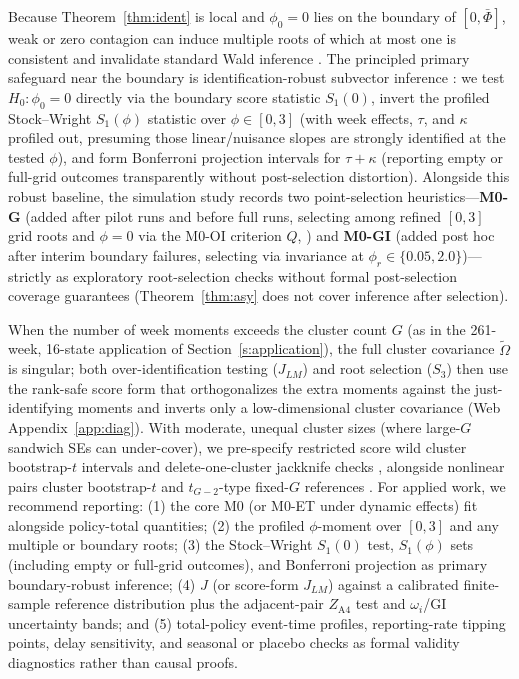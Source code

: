 Because Theorem~\ref{thm:ident} is local and $\phi_0=0$ lies on the boundary of $[0,\bar\Phi]$,
weak or zero contagion can induce multiple roots of which at most one is consistent \citep{small2000multiple}
and invalidate standard Wald inference \citep{andrews1999boundary}. The principled primary safeguard
near the boundary is identification-robust subvector inference \citep{stock2000weak,kleibergen2005testing,andrews2017subvector,cox2026simple}:
we test $H_0:\phi_0=0$ directly via the boundary score statistic $S_1(0)$, invert the profiled
Stock--Wright $S_1(\phi)$ statistic over $\phi\in[0,3]$ (with week effects, $\tau$, and $\kappa$
profiled out, presuming those linear/nuisance slopes are strongly identified at the tested $\phi$),
and form Bonferroni projection intervals for $\tau+\kappa$ (reporting empty or full-grid outcomes
transparently without post-selection distortion). Alongside this robust baseline, the simulation study
records two point-selection heuristics—\textbf{M0-G} (added after pilot runs and before full runs,
selecting among refined $[0,3]$ grid roots and $\phi=0$ via the M0-OI criterion $Q$, \citealp{heyde1998multiple})
and \textbf{M0-GI} (added post hoc after interim boundary failures, selecting via invariance at
$\phi_r\in\{0.05,2.0\}$)—strictly as exploratory root-selection checks without formal post-selection
coverage guarantees (Theorem~\ref{thm:asy} does not cover inference after selection).

When the number of week moments exceeds the cluster count $G$ (as in the 261-week, 16-state
application of Section~\ref{s:application}), the full cluster covariance $\tilde\Omega$ is
singular; both over-identification testing ($J_{LM}$) and root selection ($S_3$) then use the
rank-safe score form that orthogonalizes the extra moments against the just-identifying moments and
inverts only a low-dimensional cluster covariance (Web Appendix~\ref{app:diag}). With moderate, unequal
cluster sizes (where large-$G$ sandwich SEs can under-cover), we pre-specify restricted
score wild cluster bootstrap-$t$ intervals \citep[WCR-score with Webb six-point weights;][]{kline2012score,webb2023reworking,mackinnon2023guide}
and delete-one-cluster jackknife checks \citep{mackinnon2023jackknife}, alongside nonlinear pairs
cluster bootstrap-$t$ and $t_{G-2}$-type fixed-$G$ references \citep{hwang2021simple}. For applied work, we recommend reporting:
(1) the core M0 (or M0-ET under dynamic effects) fit alongside policy-total quantities; (2) the profiled $\phi$-moment over $[0,3]$
and any multiple or boundary roots; (3) the Stock--Wright $S_1(0)$ test, $S_1(\phi)$ sets (including empty or full-grid
outcomes), and Bonferroni projection as primary boundary-robust inference; (4) $J$ (or score-form $J_{LM}$) against a calibrated
finite-sample reference distribution plus the adjacent-pair $Z_{\mathrm{A4}}$ test and $\omega_i$/GI uncertainty bands; and
(5) total-policy event-time profiles, reporting-rate tipping points, delay sensitivity, and seasonal or placebo checks as formal validity diagnostics rather than causal proofs.
